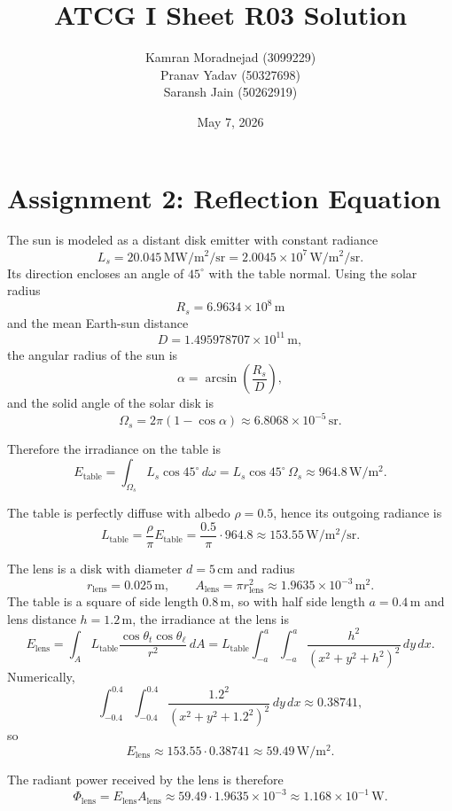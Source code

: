 \documentclass[a4paper,11pt]{article}
\title{ATCG I Sheet R03 Solution}
\author{
\large Kamran Moradnejad (3099229) \\
\large Pranav Yadav (50327698) \\
\large Saransh Jain (50262919)
}
\date{May 7, 2026}
\begin{document}
\maketitle

\section*{Assignment 2: Reflection Equation}
The sun is modeled as a distant disk emitter with constant radiance
\[
L_s = 20.045\,\si{\mega\watt\per\square\meter\per\steradian}
= 2.0045 \times 10^7\,\si{\watt\per\square\meter\per\steradian}.
\]
Its direction encloses an angle of $45^\circ$ with the table normal. Using the solar radius
\[
R_s = 6.9634 \times 10^8\,\si{\meter}
\]
and the mean Earth-sun distance
\[
D = 1.495978707 \times 10^{11}\,\si{\meter},
\]
the angular radius of the sun is
\[
\alpha = \arcsin\left(\frac{R_s}{D}\right),
\]
and the solid angle of the solar disk is
\[
\Omega_s = 2\pi(1-\cos\alpha) \approx 6.8068 \times 10^{-5}\,\si{\steradian}.
\]

Therefore the irradiance on the table is
\[
E_{\text{table}} = \int_{\Omega_s} L_s \cos 45^\circ \, d\omega
= L_s \cos 45^\circ \, \Omega_s
\approx 964.8\,\si{\watt\per\square\meter}.
\]

The table is perfectly diffuse with albedo $\rho = 0.5$, hence its outgoing radiance is
\[
L_{\text{table}} = \frac{\rho}{\pi} E_{\text{table}}
= \frac{0.5}{\pi} \cdot 964.8
\approx 153.55\,\si{\watt\per\square\meter\per\steradian}.
\]

The lens is a disk with diameter $d = 5\,\si{\centi\meter}$ and radius
\[
r_{\text{lens}} = 0.025\,\si{\meter},
\qquad
A_{\text{lens}} = \pi r_{\text{lens}}^2 \approx 1.9635 \times 10^{-3}\,\si{\square\meter}.
\]
The table is a square of side length $0.8\,\si{\meter}$, so with half side length $a = 0.4\,\si{\meter}$ and lens distance $h = 1.2\,\si{\meter}$, the irradiance at the lens is
\[
E_{\text{lens}}
= \int_A L_{\text{table}} \frac{\cos\theta_t \cos\theta_\ell}{r^2}\, dA
= L_{\text{table}} \int_{-a}^{a}\int_{-a}^{a}
\frac{h^2}{(x^2+y^2+h^2)^2}\, dy\, dx.
\]
Numerically,
\[
\int_{-0.4}^{0.4}\int_{-0.4}^{0.4}
\frac{1.2^2}{(x^2+y^2+1.2^2)^2}\, dy\, dx
\approx 0.38741,
\]
so
\[
E_{\text{lens}} \approx 153.55 \cdot 0.38741
\approx 59.49\,\si{\watt\per\square\meter}.
\]

The radiant power received by the lens is therefore
\[
\Phi_{\text{lens}} = E_{\text{lens}} A_{\text{lens}}
\approx 59.49 \cdot 1.9635 \times 10^{-3}
\approx 1.168 \times 10^{-1}\,\si{\watt}.
\]
\end{document}
